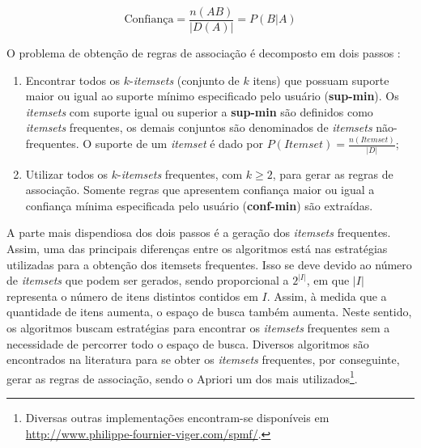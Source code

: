 \begin{equation}
\text{Confiança} = \dfrac{n(AB)}{|D(A)|} = P(B|A)
\label{eq:confiança}
\end{equation}

O problema de obtenção de regras de associação é decomposto em dois passos \cite{agrawal1993mining}:
\begin{enumerate}
	\item Encontrar todos os $k$-\textit{itemsets} (conjunto de $k$	itens) que possuam suporte maior ou igual ao suporte mínimo especificado pelo usuário (\textbf{sup-min}). Os \textit{itemsets} com suporte igual ou superior a \textbf{sup-min} são definidos como \textit{itemsets} frequentes, os demais conjuntos são denominados de \textit{itemsets} não-frequentes. O suporte de um \textit{itemset} é dado por $P(\textit{Itemset}) = \frac{n(Itemset)}{|D|}$;
	
	\item Utilizar todos os $k$-\textit{itemsets} frequentes, com $k \geq 2$, para gerar as regras de associação. Somente regras que apresentem confiança maior ou igual a confiança mínima especificada pelo usuário (\textbf{conf-min}) são extraídas.
\end{enumerate}

A parte mais dispendiosa dos dois passos é a geração dos \textit{itemsets} frequentes. Assim, uma das principais diferenças entre os algoritmos está nas estratégias utilizadas para a obtenção dos itemsets frequentes. Isso se deve devido ao número de \textit{itemsets} que podem ser gerados, sendo proporcional a $2^{|I|}$, em que $|I|$ representa o número de itens distintos contidos em $I$. Assim, à medida que a quantidade de itens aumenta, o espaço de busca também aumenta. Neste sentido, os algoritmos buscam estratégias para encontrar os \textit{itemsets} frequentes sem a necessidade de percorrer todo o espaço de busca. Diversos algoritmos são encontrados na literatura para se obter os \textit{itemsets} frequentes, por conseguinte, gerar as regras de associação, sendo o Apriori \cite{apriori} um dos mais utilizados\footnote{Diversas outras implementações encontram-se disponíveis em \url{http://www.philippe-fournier-viger.com/spmf/}.}.
